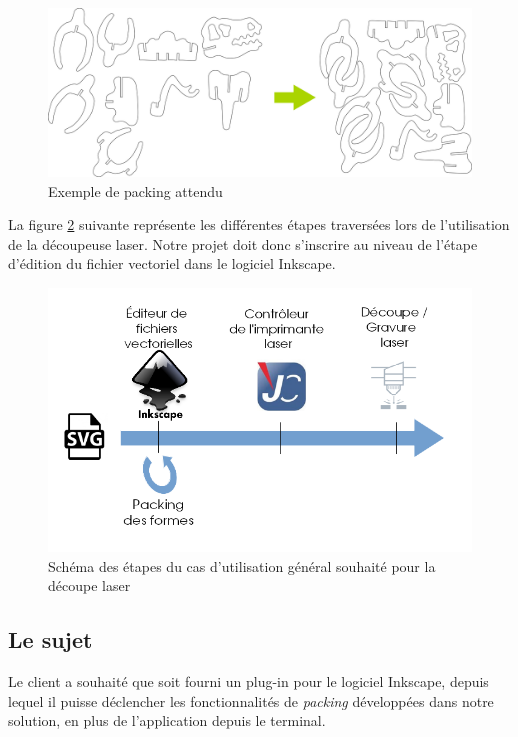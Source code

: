 \begin{figure}[!htb] 
    \centering
    \includegraphics[scale=0.12]{img/verteall.png}
    \caption{Exemple de packing attendu}
    \label{fig:before_after_pack}
\end{figure}

La figure \ref{fig:schema_besoin} suivante représente les différentes étapes traversées lors de l'utilisation de la découpeuse laser. Notre projet doit donc s'inscrire au niveau de l'étape d'édition du fichier vectoriel dans le logiciel Inkscape. 

\begin{figure}[H]
    \centering
    \includegraphics[scale=0.6]{img/schema_besoin.png}
    \caption{Schéma des étapes du cas d'utilisation général souhaité pour la découpe laser}
    \label{fig:schema_besoin}
\end{figure}




\subsection{Le sujet}

Le client a souhaité que soit fourni un plug-in pour le logiciel Inkscape, depuis lequel il puisse déclencher les fonctionnalités de \textit{packing} développées dans notre solution, en plus de l'application depuis le terminal.

